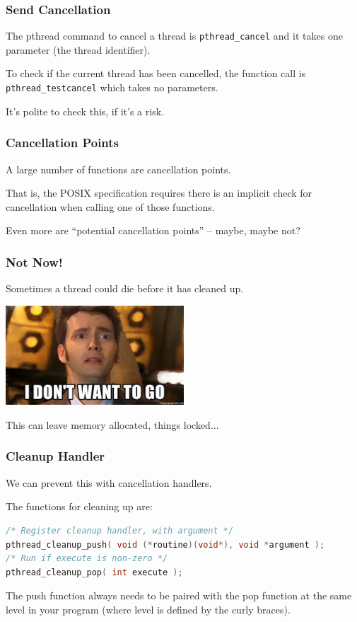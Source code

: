 \begin{frame}
	\frametitle{Send Cancellation}

	The pthread command to cancel a thread is \texttt{pthread\_cancel} and it takes one parameter (the thread identifier).

	To check if the current thread has been cancelled, the function call is \texttt{pthread\_testcancel} which takes no parameters.

	It's polite to check this, if it's a risk.

\end{frame}


\begin{frame}
	\frametitle{Cancellation Points}
	A  large number of functions are \alert{cancellation points}.

	That is, the POSIX specification requires there is an implicit check for cancellation when calling one of those functions.

	Even more are ``potential cancellation points'' -- maybe, maybe not?

\end{frame}



\begin{frame}
	\frametitle{Not Now!}
	Sometimes a thread could die before it has cleaned up.

	\begin{center}
		\includegraphics[width=0.5\textwidth]{images/tenthdoctor.jpeg}
	\end{center}

	This can leave memory allocated, things locked...

\end{frame}


\begin{frame}[fragile]
	\frametitle{Cleanup Handler}

	We can prevent this with cancellation handlers.

	The functions for cleaning up are:

	\begin{lstlisting}[language=C]
/* Register cleanup handler, with argument */
pthread_cleanup_push( void (*routine)(void*), void *argument );
/* Run if execute is non-zero */
pthread_cleanup_pop( int execute );
\end{lstlisting}

	The push function always needs to be paired with the pop function at the same level in your program (where level is defined by the curly braces).

\end{frame}


